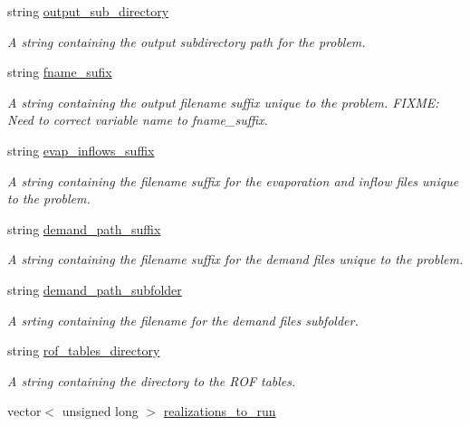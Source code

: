 \begin{DoxyCompactItemize}
string \mbox{\hyperlink{classProblem_a43fa7720db839a1db318f4745997ae2d}{output\+\_\+sub\+\_\+directory}}
\begin{DoxyCompactList}\small\item\em A string containing the output subdirectory path for the problem. \end{DoxyCompactList}\item 
string \mbox{\hyperlink{classProblem_a59444139a907aaf4c6159caed46c8118}{fname\+\_\+sufix}}
\begin{DoxyCompactList}\small\item\em A string containing the output filename suffix unique to the problem. F\+I\+X\+ME\+: Need to correct variable name to fname\+\_\+suffix. \end{DoxyCompactList}\item 
string \mbox{\hyperlink{classProblem_a1ff3958eef8bfb851a84ce0772104dca}{evap\+\_\+inflows\+\_\+suffix}}
\begin{DoxyCompactList}\small\item\em A string containing the filename suffix for the evaporation and inflow files unique to the problem. \end{DoxyCompactList}\item 
string \mbox{\hyperlink{classProblem_af9e30ddbb2f59e28f0970cf46932cd6d}{demand\+\_\+path\+\_\+suffix}}
\begin{DoxyCompactList}\small\item\em A string containing the filename suffix for the demand files unique to the problem. \end{DoxyCompactList}\item 
string \mbox{\hyperlink{classProblem_a42888c08816db8b32b355decf102d67a}{demand\+\_\+path\+\_\+subfolder}}
\begin{DoxyCompactList}\small\item\em A srting containing the filename for the demand files subfolder. \end{DoxyCompactList}\item 
string \mbox{\hyperlink{classProblem_abc641b49a4defb0dbabafbf3f9dbca6e}{rof\+\_\+tables\+\_\+directory}}
\begin{DoxyCompactList}\small\item\em A string containing the directory to the R\+OF tables. \end{DoxyCompactList}\item 
vector$<$ unsigned long $>$ \mbox{\hyperlink{classProblem_af9ed9265d0d2b4918bd468d717429de1}{realizations\+\_\+to\+\_\+run}}

\end{DoxyCompactItemize}

